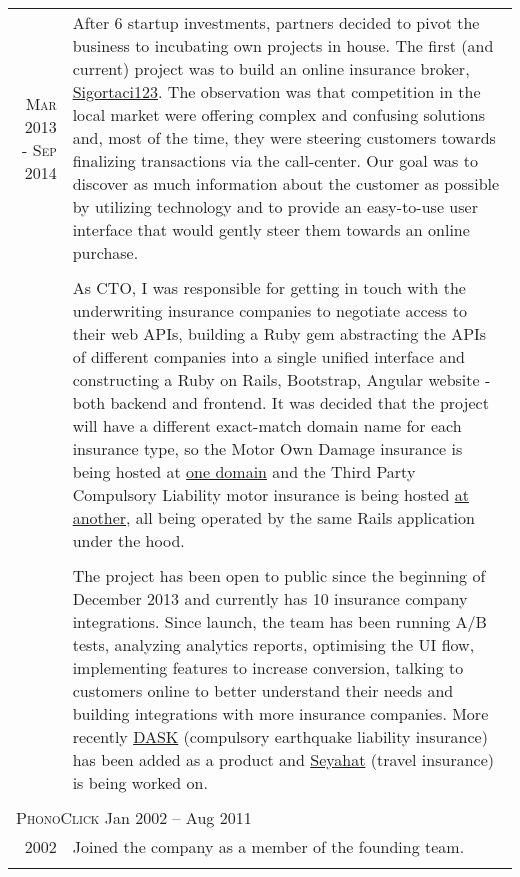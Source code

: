 \documentclass[a4paper,10pt]{article}
\newcommand{\exptitle}[2]{
  \multicolumn{2}{l}{\textsc{#1} \footnotesize{#2}} \\
  \specialrule{.01em}{0.5em}{1em}
}
\begin{document}
\begin{longtable}{r|p{11cm}}
  \textsc{Mar 2013 - Sep 2014}   & After 6 startup investments, partners decided to pivot the business to incubating own projects in house. The first (and current) project was to build an online insurance broker, \href{https://sigortaci123.com}{Sigortaci123}. The observation was that competition in the local market were offering complex and confusing solutions and, most of the time, they were steering customers towards finalizing transactions via the call-center. Our goal was to discover as much information about the customer as possible by utilizing technology and to provide an easy-to-use user interface that would gently steer them towards an online purchase. \\
                                & \\
                                & As CTO, I was responsible for getting in touch with the underwriting insurance companies to negotiate access to their web APIs, building a Ruby gem abstracting the APIs of different companies into a single unified interface and constructing a Ruby on Rails, Bootstrap, Angular website - both backend and frontend. It was decided that the project will have a different exact-match domain name for each insurance type, so the Motor Own Damage insurance is being hosted at \href{https://kasko123.com}{one domain} and the Third Party Compulsory Liability motor insurance is being hosted \href{https://trafik123.com}{at another}, all being operated by the same Rails application under the hood. \\
                                & \\
                                & The project has been open to public since the beginning of December 2013 and currently has 10 insurance company integrations. Since launch, the team has been running A/B tests, analyzing analytics reports, optimising the UI flow, implementing features to increase conversion, talking to customers online to better understand their needs and building integrations with more insurance companies. More recently \href{https://dask123.com}{DASK} (compulsory earthquake liability insurance) has been added as a product and \href{https://seyahat123.com}{Seyahat} (travel insurance) is being worked on. \\
  \multicolumn{2}{c}{} \\


  \exptitle{PhonoClick}{Jan 2002 – Aug 2011}

  \textsc{2002}                 & Joined the company as a member of the founding team. \\
  \multicolumn{2}{c}{} \\


\end{longtable}
\end{document}

